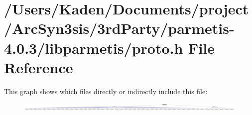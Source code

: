\hypertarget{a00951}{}\section{/\+Users/\+Kaden/\+Documents/project/\+Arc\+Syn3sis/3rd\+Party/parmetis-\/4.0.3/libparmetis/proto.h File Reference}
\label{a00951}
This graph shows which files directly or indirectly include this file\+:\nopagebreak
\begin{figure}[H]
\begin{center}
\leavevmode
\includegraphics[width=350pt]{a00953}
\end{center}
\end{figure}
